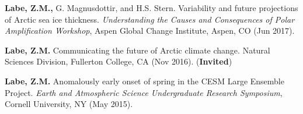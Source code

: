 \documentclass[margin,line,palatino,courier,10pt]{res}
\begin{document}
\begin{resume}
\begin{etaremune}[leftmargin=0in,topsep=0in,parsep=0in]
\item \textbf{Labe, Z.M.,} G. Magnusdottir, and H.S. Stern. Variability and future projections of Arctic sea ice thickness. \textit{Understanding the Causes and Consequences of Polar Amplification Workshop}, Aspen Global Change Institute, Aspen, CO (Jun 2017). 
\item \textbf{Labe, Z.M.} Communicating the future of Arctic climate change. Natural Sciences Division, Fullerton College, CA (Nov 2016). (\textbf{Invited})
\item \textbf{Labe, Z.M.} Anomalously early onset of spring in the CESM Large Ensemble Project. \textit{Earth and Atmospheric Science Undergraduate Research Symposium}, Cornell University, NY (May 2015). 

\end{etaremune}


\end{resume}
\end{document}

